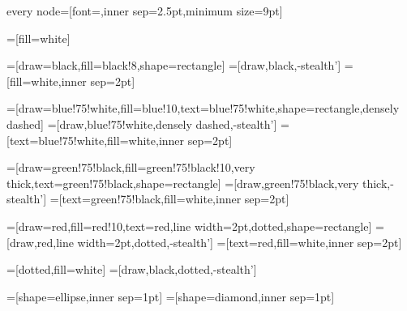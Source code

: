 \usepackage{tikz}
\usetikzlibrary{arrows,automata,positioning,er}

\tikzstyle every node=[font=\footnotesize\sffamily,inner sep=2.5pt,minimum size=9pt]

\newcommand{\red}{red}
\newcommand{\redfill}{\red!10}
\newcommand{\green}{green!75!black}
\newcommand{\greenfill}{\green!10}
\newcommand{\blue}{blue!75!white}
\newcommand{\bluefill}{blue!10}
\newcommand{\grey}{black!8}
=[fill=white]

=[draw=black,fill=\grey,shape=rectangle]
=[draw,black,-stealth']
=[fill=white,inner sep=2pt]

=[draw=\blue,fill=\bluefill,text=\blue,shape=rectangle,densely dashed]
=[draw,\blue,densely dashed,-stealth']
=[text=\blue,fill=white,inner sep=2pt]

=[draw=\green,fill=\greenfill,very thick,text=\green,shape=rectangle]
=[draw,\green,very thick,-stealth']
=[text=\green,fill=white,inner sep=2pt]

=[draw=\red,fill=\redfill,text=\red,line width=2pt,dotted,shape=rectangle]
=[draw,\red,line width=2pt,dotted,-stealth']
=[text=\red,fill=white,inner sep=2pt]

=[dotted,fill=white]
=[draw,black,dotted,-stealth']

=[shape=ellipse,inner sep=1pt]
=[shape=diamond,inner sep=1pt]

\newcommand{\ml}[1]{
\begin{tabular}{@{}l@{}}#1\vspace{-2pt}\end{tabular}
}

